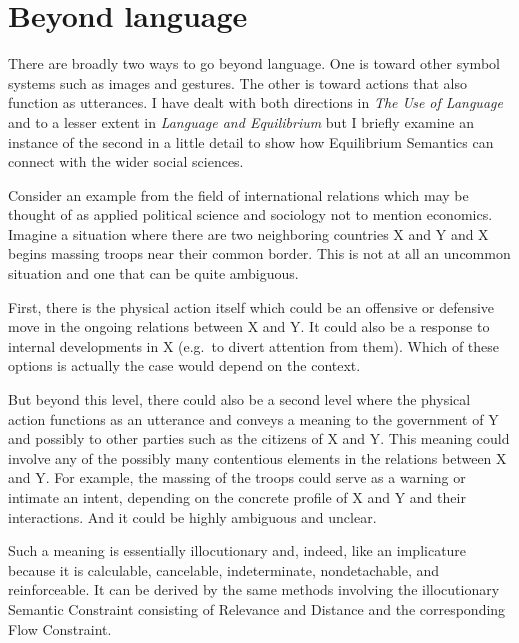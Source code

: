 \chapter{Beyond language} \label{ch:beyond language}\largerpage[-1]

There are broadly two ways to go beyond language. One is toward other symbol systems such as images and gestures. The other is toward actions that also function as utterances. I have dealt with both directions in \emph{The Use of Language} and to a lesser extent in \emph{Language and Equilibrium} but I briefly examine an instance of the second in a little detail to show how Equilibrium Semantics can connect with the wider social sciences.

Consider an example from the field of international relations which may be thought of as applied political science and sociology not to mention economics. Imagine a situation where there are two neighboring countries X and Y and X begins massing troops near their common border. This is not at all an uncommon situation and one that can be quite ambiguous.

First, there is the physical action itself which could be an offensive or defensive move in the ongoing relations between X and Y. It could also be a response to internal developments in X (e.g.\ to divert attention from them). Which of these options is actually the case would depend on the context.

But beyond this level, there could also be a second level where the physical action functions as an utterance and conveys a meaning to the government of Y and possibly to other parties such as the citizens of X and Y. This meaning could involve any of the possibly many contentious elements in the relations between X and Y. For example, the massing of the troops could serve as a warning or intimate an intent, depending on the concrete profile of X and Y and their interactions. And it could be highly ambiguous and unclear.

Such a meaning is essentially illocutionary and, indeed, like an implicature because it is calculable, cancelable, indeterminate, nondetachable, and reinforceable. It can be derived by the same methods involving the illocutionary Semantic Constraint consisting of Relevance and Distance and the corresponding Flow Constraint.

